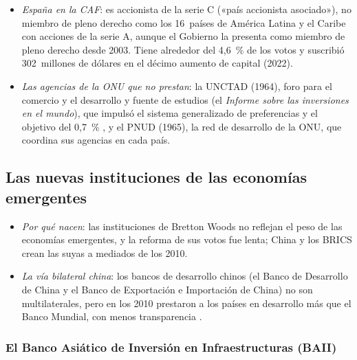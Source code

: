 \documentclass[11pt]{article}
\begin{document}
\begin{anotaciones}
\begin{itemize}
\item \emph{España en la CAF}: es accionista de la serie C («país accionista asociado»), no miembro de pleno derecho como los 16~países de América Latina y el Caribe con acciones de la serie A, aunque el Gobierno la presenta como miembro de pleno derecho desde 2003. Tiene alrededor del 4,6~\% de los votos y suscribió 302~millones de dólares en el décimo aumento de capital (2022)\nocite{CAF2026Estados,Espana2024CapitalExigible}.
\item \emph{Las agencias de la ONU que no prestan}: la UNCTAD (1964), foro para el comercio y el desarrollo y fuente de estudios (el \emph{Informe sobre las inversiones en el mundo}), que impulsó el sistema generalizado de preferencias y el objetivo del 0,7~\% , y el PNUD (1965), la red de desarrollo de la ONU, que coordina sus agencias en cada país.
\end{itemize}
\end{anotaciones}

\subsection{Las nuevas instituciones de las economías emergentes}\label{sec:nuevas}

\begin{itemize}
\item \emph{Por qué nacen}: las instituciones de Bretton Woods no reflejan el peso de las economías emergentes, y la reforma de sus votos fue lenta; China y los BRICS crean las suyas a mediados de los 2010.
\item \emph{La vía bilateral china}: los bancos de desarrollo chinos (el Banco de Desarrollo de China y el Banco de Exportación e Importación de China) no son multilaterales, pero en los 2010 prestaron a los países en desarrollo más que el Banco Mundial, con menos transparencia .
\end{itemize}

\subsubsection{El Banco Asiático de Inversión en Infraestructuras (BAII)}\label{sec:baii}
\end{document}
